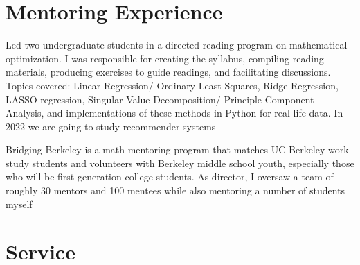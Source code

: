 \documentclass[11pt,letter]{moderncv}
\begin{document}
\section{Mentoring Experience}
\vspace{0.05in}
\begin{itemize}
 {Led two undergraduate students in a directed reading program on mathematical optimization.  I was responsible for creating the syllabus, compiling reading materials, producing exercises to guide readings, and facilitating discussions. Topics covered: Linear Regression/ Ordinary Least Squares, Ridge Regression, LASSO regression, Singular Value Decomposition/ Principle Component Analysis, and implementations of these methods in Python for real life data. In 2022 we are going to study recommender systems}{}{}{}{}
\end{itemize}
\vspace{0.05in}
\begin{itemize}
 {Bridging Berkeley is a math mentoring program that matches UC Berkeley work-study students and volunteers with Berkeley middle school youth, especially those who will be first-generation college students. As director, I oversaw a team of roughly 30 mentors and 100 mentees while also mentoring a number of students myself}{}{}{}{}
\end{itemize}
\vspace{0.05in}


\section{Service}
\end{document}

